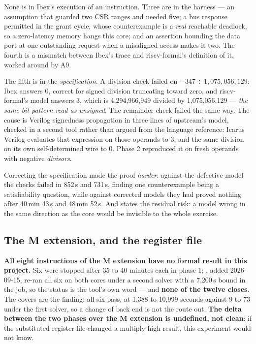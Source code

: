 None is in Ibex's execution of an instruction. Three are in the harness --- an assumption that guarded two CSR ranges and needed five; a bus response permitted in the grant cycle, whose counterexample is a \emph{real} reachable deadlock, so a zero-latency memory hangs this core; and an assertion bounding the data port at one outstanding request when a misaligned access makes it two. The fourth is a mismatch between Ibex's trace and riscv-formal's definition of it, worked around by A9.

The fifth is in the \emph{specification}. A division check failed on
$-347 \div 1{,}075{,}056{,}129$: Ibex answers 0, correct for signed
division truncating toward zero, and riscv-formal's model answers 3,
which is 4,294,966,949 divided by 1,075,056,129 --- \emph{the same bit
pattern read as unsigned}. The remainder check failed the same way. The cause is Verilog signedness propagation in three lines of upstream's model, checked in a second tool rather than argued from the language reference: Icarus Verilog evaluates that expression on those operands to 3, and the same division on its own self-determined wire to 0. Phase 2 reproduced it on fresh operands with negative \emph{divisors}.

Correcting the specification made the proof \emph{harder}: against the defective model the checks failed in 852\,s and 731\,s, finding one counterexample being a satisfiability question, while against corrected models they had proved nothing after 40\,min 43\,s and 48\,min 52\,s. And  states the residual risk: a model wrong in the same direction as the core would be invisible to the whole exercise.

\subsection{The M extension, and the register file}

\textbf{All eight instructions of the M extension have no formal result
in this project.} Six were stopped after 35 to 40 minutes each in phase 1; , added 2026-09-15, re-ran all six on both cores under a second solver with a 7,200\,s bound in the job, so the status is the tool's own word --- and \textbf{none of the twelve closes}. The covers are the finding: all six pass, at 1,388 to 10,999 seconds against 9 to 73 under the first solver, so a change of back end is not the route out. \textbf{The delta between the two phases over
the M extension is undefined, not clean}: if the substituted register
file changed a multiply-high result, this experiment would not know.

